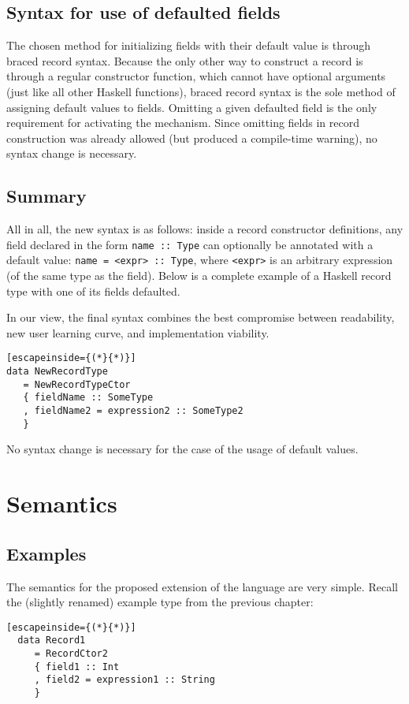 \documentclass[en]{pracamgr}
\begin{document}
\section{Syntax for use of defaulted fields}

The chosen method for initializing fields with their default value is through braced record syntax.
Because the only other way to construct a record is through a regular constructor function, which cannot have optional arguments (just like all other Haskell functions), braced record syntax is the sole method of assigning default values to fields.
Omitting a given defaulted field is the only requirement for activating the mechanism. 
Since omitting fields in record construction was already allowed (but produced a compile-time warning), no syntax change is necessary.

\section{Summary}
All in all, the new syntax is as follows: inside a record constructor definitions, any field declared in the form \texttt{name :: Type}
can optionally be annotated with a default value: \texttt{name = <expr> :: Type}, 
where \texttt{<expr>} is an arbitrary expression (of the same type as the field).
Below is a complete example of a Haskell record type with one of its fields defaulted. 

In our view, the final syntax combines the best compromise between readability, new user learning curve, and implementation viability.

\begin{lstlisting}[escapeinside={(*}{*)}]
data NewRecordType
   = NewRecordTypeCtor 
   { fieldName :: SomeType 
   , fieldName2 = expression2 :: SomeType2
   }
\end{lstlisting}
No syntax change is necessary for the case of the usage of default values.

\chapter{Semantics}
\section{Examples}
The semantics for the proposed extension of the language are very simple.
Recall the (slightly renamed) example type from the previous chapter:

\begin{lstlisting}[escapeinside={(*}{*)}]
  data Record1
     = RecordCtor2 
     { field1 :: Int
     , field2 = expression1 :: String
     }
\end{lstlisting}
  
\end{document}
